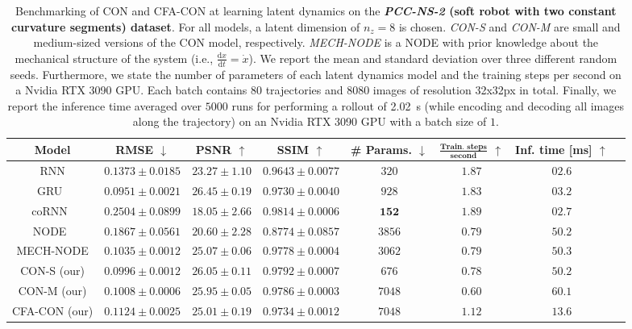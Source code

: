 \begin{table}[ht]
    \centering
    \begin{scriptsize}
    \setlength\tabcolsep{2.0pt}
    \begin{tabular}{c c c c c c c c}
         \toprule
         \textbf{Model} & \textbf{RMSE} $\downarrow$ & \textbf{PSNR} $\uparrow$ & \textbf{SSIM} $\uparrow$ & \textbf{\# Params.} $\downarrow$ & $\mathbf{\frac{\text{Train. steps}}{\text{second}}}$ $\uparrow$ & \textbf{Inf. time} [ms] $\uparrow$\\
         \midrule
         RNN & $0.1373 \pm 0.0185$ & $23.27 \pm 1.10$ & $0.9643 \pm 0.0077$ & $320$ & $1.87$ & $02.6$\\
         GRU~\citep{cho2014learning} & $0.0951 \pm 0.0021$ & $\mathbf{26.45 \pm 0.19}$ & $0.9730 \pm 0.0040$ & $928$ & $1.83$ & $03.2$\\
         coRNN~\citep{rusch2020coupled} & $0.2504 \pm 0.0899$ & $18.05 \pm 2.66$ & $0.9814 \pm 0.0006$ & $\mathbf{152}$ & $\mathbf{1.89}$ & $02.7$\\
         NODE~\citep{chen2018neural} & $0.1867 \pm 0.0561$ & $20.60 \pm 2.28$ & $0.8774 \pm 0.0857$ & $3856$ & $0.79$ & $50.2$\\
         MECH-NODE & $0.1035 \pm 0.0012$ & $25.07 \pm 0.06$ & $0.9778 \pm 0.0004$ & $3062$ & $0.79$ & $50.3$\\
         CON-S (our) & $0.0996 \pm 0.0012$ & $26.05 \pm 0.11$ & $\mathbf{0.9792 \pm 0.0007}$ & $676$ & $0.78$ & $50.2$\\
         CON-M (our) & $0.1008 \pm 0.0006$ & $25.95 \pm 0.05$ & $0.9786 \pm 0.0003$ & $7048$ & $0.60$ & $60.1$\\
         CFA-CON (our) & $0.1124 \pm 0.0025$ & $25.01 \pm 0.19$ & $0.9734 \pm 0.0012$ & $7048$ & $1.12$ & $13.6$\\
         \bottomrule
    \end{tabular}
    \end{scriptsize}
    \vspace{0.5cm}
    \caption{Benchmarking of \gls{CON} and \gls{CFA-CON} at learning latent dynamics on the \textbf{\emph{PCC-NS-2} (soft robot with two constant curvature segments) dataset}. For all models, a latent dimension of $n_z=8$ is chosen. \emph{CON-S} and \emph{CON-M} are small and medium-sized versions of the \gls{CON} model, respectively. \emph{MECH-NODE} is a \gls{NODE} with prior knowledge about the mechanical structure of the system (i.e., $\frac{\mathrm{d}x}{\mathrm{d}t} = \dot{x}$). We report the mean and standard deviation over three different random seeds. Furthermore, we state the number of parameters of each latent dynamics model and the training steps per second on a Nvidia RTX 3090 GPU. Each batch contains $80$ trajectories and $8080$ images of resolution 32x32px in total. Finally, we report the inference time averaged over $5000$ runs for performing a rollout of \SI{2.02}{s} (while encoding and decoding all images along the trajectory) on an Nvidia RTX 3090 GPU with a batch size of $1$.
}
    \label{tab:apx-con:latent_dynamics_results:pcc_ns-2}
\end{table}

